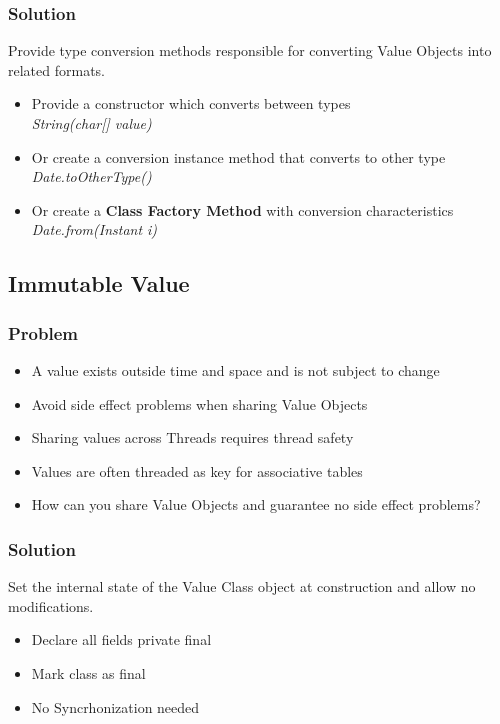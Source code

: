\subsubsection{Solution}
Provide type conversion methods responsible for converting Value Objects into related formats.
\begin{itemize}
    \item Provide a constructor which converts between types\\\textit{String(char[] value)}
    \item Or create a conversion instance method that converts to other type \\\textit{Date.toOtherType()}
    \item Or create a \textbf{Class Factory Method} with conversion characteristics \\\textit{Date.from(Instant i)}
\end{itemize}

\subsection{Immutable Value}
\subsubsection{Problem}
\begin{itemize}
    \item A value exists outside time and space and is not subject to change
    \item Avoid side effect problems when sharing Value Objects
    \item Sharing values across Threads requires thread safety
    \item Values are often threaded as key for associative tables
    \item How can you share Value Objects and guarantee no side effect problems?
\end{itemize}
\subsubsection{Solution}
Set the internal state of the Value Class object at construction and allow no modifications.\\ 
\begin{itemize}
    \item Declare all fields private final
    \item Mark class as final
    \item No Syncrhonization needed
\end{itemize}

